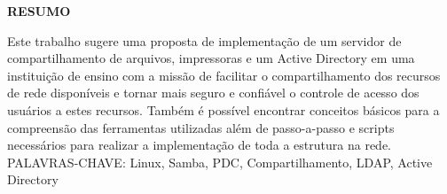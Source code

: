 \begin{center}
\textbf{RESUMO}
\end{center}
\singlespacing

\noindent Este trabalho sugere uma proposta de implementação de um servidor de compartilhamento de arquivos, impressoras e um Active Directory em uma instituição de ensino com a missão de facilitar o compartilhamento dos recursos de rede disponíveis e tornar mais seguro e confiável o controle de acesso dos usuários a estes recursos. Também é possível encontrar conceitos básicos para a compreensão das ferramentas utilizadas além de passo-a-passo e scripts necessários para realizar a implementação de toda a estrutura na rede. \\

\noindent PALAVRAS-CHAVE: Linux, Samba, PDC, Compartilhamento, LDAP, Active Directory
